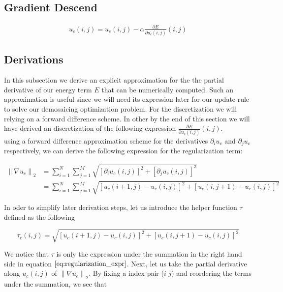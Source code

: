 \documentclass{paper}
\newcommand{\norm}[1]{\left\lVert#1\right\rVert}
\begin{document}
\subsection{Gradient Descend}

\begin{align}
	u_{c}(i,j) = u_{c}(i,j) - \alpha \frac{\partial{E}}{\partial{u_{c} (i,j)}}(i,j)
\end{align}

\subsection{Derivations}

In this subsection we derive an explicit approximation for the the partial derivative of our energy term $E$ that can be numerically computed. Such an approximation is useful since we will need its expression later for our update rule to solve our demosaicing optimization problem. For the discretization we will relying on a forward difference scheme. In other by the end of this section we will have derived an discretization of the following expression $\frac{\partial{E}}{\partial{u_{c} (i,j)}}(i,j)$. \\


using a forward difference approximation scheme for the derivatives $\partial_{i} u_c$ and $\partial_{j} u_c$ respectively, we can derive the following expression for the regularization term:

\begin{align}
	 \norm{\nabla{u_{c}}}_2 
	&= \sum_{i=1}^N \sum_{j=1}^M \sqrt{[\partial_{i} u_c(i,j)]^2 + [\partial_{j} u_c(i,j)]^2} \nonumber \\ 
	&= \sum_{i=1}^N \sum_{j=1}^M \sqrt{\left[ u_{c}\left(i+1, j\right) - u_{c}\left(i,j\right) \right]^2 + \left[ u_{c}\left(i, j+1 \right) - u_{c}\left(i,j\right) \right]^2}
\label{eq:regularization_expr}
\end{align}

In oder to simplify later derivation steps, let us introduce the helper function $\tau$ defined as the following 

\begin{equation}
	 \tau_{c}\left(i,j\right)
	= \sqrt{\left[ u_{c}\left(i+1, j\right) - u_{c}\left(i,j\right) \right]^2 + \left[ u_{c}\left(i, j+1 \right) - u_{c}\left(i,j\right) \right]^2}
\end{equation}

We notice that $\tau$ is only the expression under the summation in the right hand side in equation $\ref{eq:regularization_expr}$. Next, let us take the partial derivative along $u_{c}(i,j)$ of $\norm{\nabla{u_{c}}}_2$. By fixing a index pair ($i$ $j$) and reordering the terms under the summation, we see that 
\end{document}
